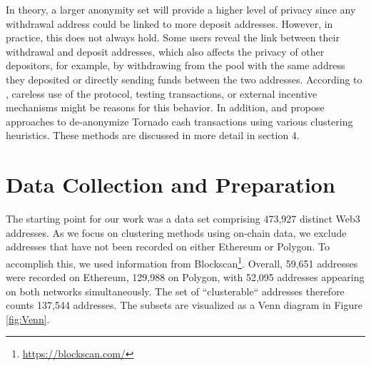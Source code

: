 \documentclass[12pt,a4paper,titlepage,oneside,english]{article}
\begin{document}
In theory, a larger anonymity set will provide a higher level of privacy since any withdrawal address could be linked to more deposit addresses. However, in practice, this does not always hold.
Some users reveal the link between their withdrawal and deposit addresses, which also affects the privacy of other depositors, for example, by withdrawing from the pool with the same address they deposited or directly sending funds between the two addresses. According to \cite{nadler2023tornado}, careless use of the protocol, testing transactions, or external incentive mechanisms might be reasons for this behavior. \newline
In addition, \cite{Beres2020} and \cite{wu2022tutela} propose approaches to de-anonymize Tornado cash transactions using various clustering heuristics. These methods are discussed in more detail in section 4.



\section{Data Collection and Preparation} 
The starting point for our work was a data set comprising 473,927 distinct Web3 addresses. %
 As we focus on clustering methods using on-chain data, we exclude addresses that have not been recorded on either Ethereum or Polygon. To accomplish this, we used information from Blockscan\footnote{\url{https://blockscan.com/}}. Overall, 59,651 addresses were recorded on Ethereum, 129,988 on Polygon, with 52,095 addresses appearing on both networks simultaneously. The set of ``clusterable`` addresses therefore counts 137,544 addresses. The subsets are visualized as a Venn diagram in Figure \ref{fig:Venn}.
 
\end{document}
